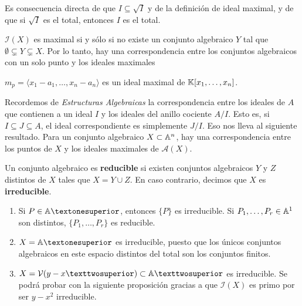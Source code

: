 \documentclass[ACGA.tex]{subfiles}
\begin{document}
\begin{dem}
Es consecuencia directa de que $I \subseteq \sqrt{I}$ y de la definición de ideal maximal, y de que si $\sqrt{I}$ es el total, entonces $I$ es el total.\QED
\end{dem}

\begin{teorema}
$\mathcal{I}(X)$ es maximal si y sólo si no existe un conjunto algebraico $Y$ tal que $\emptyset \subsetneq Y \subsetneq X$. Por lo tanto, hay una correspondencia entre los conjuntos algebraicos con un solo punto y los ideales maximales
\end{teorema}

\begin{ejer}
$m_p = \langle x_1-a_1, \dots,x_n-a_n \rangle$ es un ideal maximal de $\mathbb{K}[x_1,\dots,x_n]$.
\end{ejer}

\begin{nota}
Recordemos de \emph{Estructuras Algebraicas} la correspondencia entre los ideales de $A$ que contienen a un ideal $I$ y los ideales del anillo cociente $A/I$. Esto es, si $I\subseteq J\subseteq A$, el ideal correspondiente es simplemente $J/I$. Eso nos lleva al siguiente resultado. Para un conjunto algebraico $X \subset \mathbb{A}^n$, hay una correspondencia entre los puntos de $X$ y los ideales maximales de $\mathcal{A}(X)$.
\end{nota}

\begin{defi}
Un conjunto algebraico es \textbf{reducible} si existen conjuntos algebraicos $Y$ y $Z$ distintos de $X$ tales que $X = Y \cup Z$. En caso contrario, decimos que $X$ es \textbf{irreducible}.
\end{defi}

\begin{ej}\mbox{}
\begin{enumerate}
	\item Si $P \in \A¹$, entonces $\{P\}$ es irreducible. Si $P_1,\dots,P_r \in \mathbb{A}^1$ son distintos, $\{P_1,\dots,P_r\}$ es reducible.
	\item $X=\A¹$ es irreducible, puesto que los únicos conjuntos algebraicos en este espacio distintos del total son los conjuntos finitos.
	\item $X=\mathcal{V}(y-x²) \subset \A²$ es irreducible. Se podrá probar con la siguiente proposición gracias a que $\mathcal{I}(X)$ es primo por ser $y-x^2$ irreducible.
\end{enumerate}
\end{ej}
\end{document}
